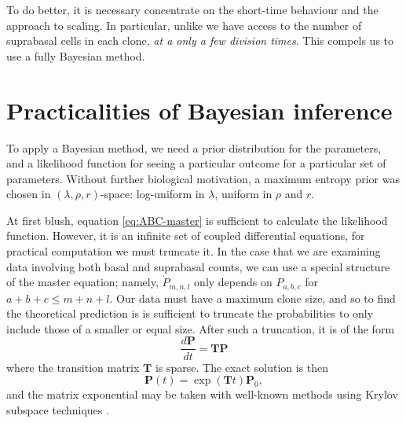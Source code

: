 \documentclass[10pt,english]{report}
\begin{document}
To do better, it is necessary concentrate on the short-time behaviour and the approach to scaling. In particular, unlike \citet{clayton} we have access to the number of suprabasal cells in each clone, \emph{at a only a few division times}. This compels us to use a fully Bayesian method.

\section{Practicalities of Bayesian inference}

To apply a Bayesian method, we need a prior distribution for the parameters, and a likelihood function for seeing a particular outcome for a particular set of parameters. Without further biological motivation, a maximum entropy prior was chosen in $(\lambda, \rho, r)$-space: log-uniform in $\lambda$, uniform in $\rho$ and $r$. 

At first blush, equation \eqref{eq:ABC-master} is sufficient to calculate the likelihood function. However, it is an infinite set of coupled differential equations, for practical computation we must truncate it. In the case that we are examining data involving both basal and suprabasal counts, we can use a special structure of the master equation; namely, $\dot{P}_{m,n,l}$ only depends on $P_{a,b,c}$ for $a+b+c \le m+n+l$. Our data must have a maximum clone size, and so to find the theoretical prediction is is sufficient to truncate the probabilities to only include those of a smaller or equal size. After such a truncation, it is of the form $$\frac{d\mathbf{P}}{dt} = \mathbf{TP}$$ where the transition matrix $\mathbf{T}$ is sparse. The exact solution is then $$\mathbf{P}(t) = \exp\left(\mathbf{T}t\right) \mathbf{P}_0,$$ and the matrix exponential may be taken with well-known methods using Krylov subspace techniques \citep{expokit}.
\end{document}
